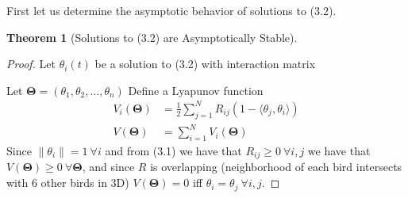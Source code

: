 \documentclass[11pt,a4paper]{article}
\numberwithin{equation}{section}
\newcommand{\T}{\mathbf{\Theta}}
\newtheorem{theorem}{Theorem}[section]
\theoremstyle{definition}
\theoremstyle{assumption}
\begin{document}
First let us determine the asymptotic behavior of solutions to (3.2). 
\begin{theorem}[Solutions to (3.2) are Asymptotically Stable]\label{thm:asymptotic_stability}
\end{theorem}
\begin{proof}
    Let $\theta_i(t)$ be a solution to (3.2) with interaction matrix

Let $\T=(\theta_1, \theta_2, \ldots, \theta_n)$ Define a Lyapunov function
\begin{align}
    V_i(\T) &= \frac12 \sum_{j=1}^N R_{ij}(1-\langle \theta_j, \theta_i \rangle)\\
    V(\T) &= \sum_{i=1}^N V_i(\T)
\end{align}
Since $\|\theta_i\|=1 \ \forall i$ and from (3.1) we have that $R_{ij}\geq 0 \ \forall i,j$
we have that $V(\T)\geq 0 \ \forall \T$, and since $R$ is overlapping (neighborhood of each bird intersects with 6 other birds in 3D) $V(\T)=0$ iff $\theta_i=\theta_j \ \forall i,j$.


\end{proof}
\end{document}
